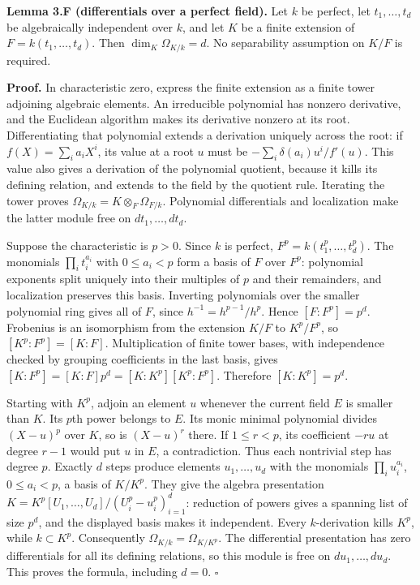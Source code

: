 \documentclass[11pt,a4paper,openany]{report}
\begin{document}
\textbf{Lemma 3.F (differentials over a perfect field).} Let \(k\) be perfect, let \(t_1,\ldots,t_d\) be algebraically independent over \(k\), and let \(K\) be a finite extension of \(F=k(t_1,\ldots,t_d)\). Then \(\dim_K\Omega_{K/k}=d\). No separability assumption on \(K/F\) is required.

\textbf{Proof.} In characteristic zero, express the finite extension as a finite tower adjoining algebraic elements. An irreducible polynomial has nonzero derivative, and the Euclidean algorithm makes its derivative nonzero at its root. Differentiating that polynomial extends a derivation uniquely across the root: if \(f(X)=\sum_i a_iX^i\), its value at a root \(u\) must be \(-\sum_i\delta(a_i)u^i/f'(u)\). This value also gives a derivation of the polynomial quotient, because it kills its defining relation, and extends to the field by the quotient rule. Iterating the tower proves \(\Omega_{K/k}=K\otimes_F\Omega_{F/k}\). Polynomial differentials and localization make the latter module free on \(dt_1,\ldots,dt_d\).

Suppose the characteristic is \(p>0\). Since \(k\) is perfect, \(F^p=k(t_1^p,\ldots,t_d^p)\). The monomials \(\prod_i t_i^{a_i}\) with \(0\leq a_i<p\) form a basis of \(F\) over \(F^p\): polynomial exponents split uniquely into their multiples of \(p\) and their remainders, and localization preserves this basis. Inverting polynomials over the smaller polynomial ring gives all of \(F\), since \(h^{-1}=h^{p-1}/h^p\). Hence \([F:F^p]=p^d\). Frobenius is an isomorphism from the extension \(K/F\) to \(K^p/F^p\), so \([K^p:F^p]=[K:F]\). Multiplication of finite tower bases, with independence checked by grouping coefficients in the last basis, gives \([K:F^p]=[K:F]p^d=[K:K^p][K^p:F^p]\). Therefore \([K:K^p]=p^d\).

Starting with \(K^p\), adjoin an element \(u\) whenever the current field \(E\) is smaller than \(K\). Its \(p\)th power belongs to \(E\). Its monic minimal polynomial divides \((X-u)^p\) over \(K\), so is \((X-u)^r\) there. If \(1\leq r<p\), its coefficient \(-ru\) at degree \(r-1\) would put \(u\) in \(E\), a contradiction. Thus each nontrivial step has degree \(p\). Exactly \(d\) steps produce elements \(u_1,\ldots,u_d\) with the monomials \(\prod_i u_i^{a_i}\), \(0\leq a_i<p\), a basis of \(K/K^p\). They give the algebra presentation \(K=K^p[U_1,\ldots,U_d]/(U_i^p-u_i^p)_{i=1}^d\): reduction of powers gives a spanning list of size \(p^d\), and the displayed basis makes it independent. Every \(k\)-derivation kills \(K^p\), while \(k\subset K^p\). Consequently \(\Omega_{K/k}=\Omega_{K/K^p}\). The differential presentation has zero differentials for all its defining relations, so this module is free on \(du_1,\ldots,du_d\). This proves the formula, including \(d=0\). \(\square\)
\end{document}
